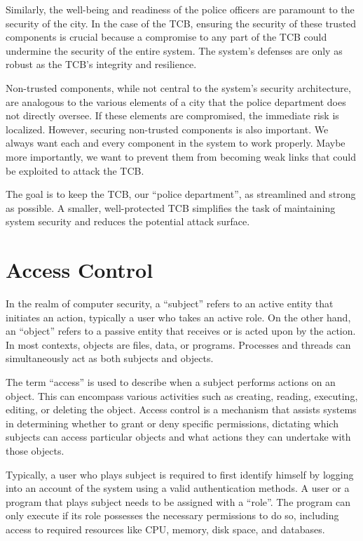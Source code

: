Similarly, the well-being and readiness of the police officers are paramount to the security of the city. In the case of the TCB, ensuring the security of these trusted components is crucial because a compromise to any part of the TCB could undermine the security of the entire system. The system's defenses are only as robust as the TCB's integrity and resilience.

Non-trusted components, while not central to the system's security architecture, are analogous to the various elements of a city that the police department does not directly oversee. If these elements are compromised, the immediate risk is localized. However, securing non-trusted components is also important. We always want each and every component in the system to work properly. Maybe more importantly, we want to prevent them from becoming weak links that could be exploited to attack the TCB.

The goal is to keep the TCB, our ``police department'', as streamlined and strong as possible. A smaller, well-protected TCB simplifies the task of maintaining system security and reduces the potential attack surface.

\section{Access Control}

In the realm of computer security, a ``subject'' refers to an active entity that initiates an action, typically a user who takes an active role. On the other hand, an ``object'' refers to a passive entity that receives or is acted upon by the action. In most contexts, objects are files, data, or programs. Processes and threads can simultaneously act as both subjects and objects.

The term ``access'' is used to describe when a subject performs actions on an object. This can encompass various activities such as creating, reading, executing, editing, or deleting the object. Access control is a mechanism that assists systems in determining whether to grant or deny specific permissions, dictating which subjects can access particular objects and what actions they can undertake with those objects. 

Typically, a user who plays subject is required to first identify himself by logging into an account of the system using a valid authentication methods. A user or a program that plays subject needs to be assigned with a ``role''. The program can only execute if its role possesses the necessary permissions to do so, including access to required resources like CPU, memory, disk space, and databases.

